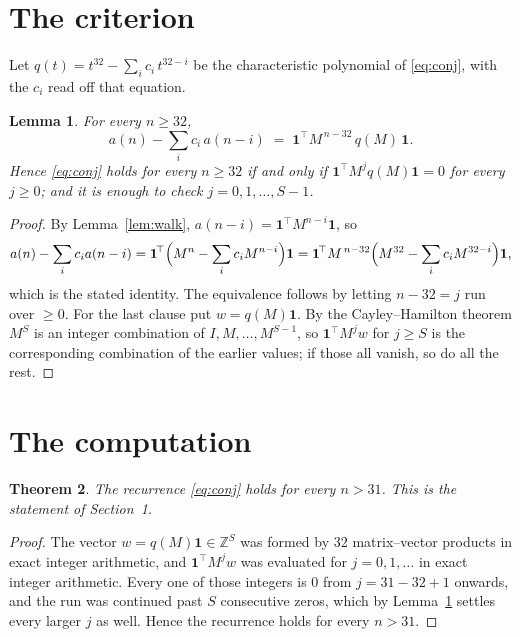 \documentclass[11pt,a4paper]{article}
\theoremstyle{plain}
\newtheorem{theorem}{Theorem}
\newtheorem{lemma}[theorem]{Lemma}
\theoremstyle{definition}
\begin{document}
\section{The criterion}

Let $q(t)=t^{32}-\sum_{i}c_i\,t^{32-i}$ be the characteristic polynomial of
\eqref{eq:conj}, with the $c_i$ read off that equation.

\begin{lemma}\label{lem:crit}
For every $n\ge32$,
\[
a(n)-\sum_i c_i\,a(n-i)\;=\;\mathbf{1}^{\!\top}M^{\,n-32}\,q(M)\,\mathbf{1} .
\]
Hence \eqref{eq:conj} holds for every $n\ge32$ if and only if
$\mathbf{1}^{\!\top}M^{j}q(M)\mathbf{1}=0$ for every $j\ge0$; and it is enough to
check $j=0,1,\dots,S-1$.
\end{lemma}

\begin{proof}
By Lemma~\ref{lem:walk}, $a(n-i)=\mathbf{1}^{\!\top}M^{n-i}\mathbf{1}$, so
\[
a(n)-\sum_i c_i a(n-i)
=\mathbf{1}^{\!\top}\Bigl(M^{n}-\sum_i c_i M^{n-i}\Bigr)\mathbf{1}
=\mathbf{1}^{\!\top}M^{\,n-32}\Bigl(M^{32}-\sum_i c_i M^{32-i}\Bigr)\mathbf{1},
\]
which is the stated identity. The equivalence follows by letting $n-32=j$ run over
$\ge0$. For the last clause put $w=q(M)\mathbf{1}$. By the Cayley--Hamilton theorem
$M^{S}$ is an integer combination of $I,M,\dots,M^{S-1}$, so
$\mathbf{1}^{\!\top}M^{j}w$ for $j\ge S$ is the corresponding combination of the
earlier values; if those all vanish, so do all the rest.
\end{proof}

\section{The computation}

\begin{theorem}
The recurrence \eqref{eq:conj} holds for every $n>31$. This is the statement of
Section~1.
\end{theorem}

\begin{proof}
The vector $w=q(M)\mathbf{1}\in\mathbb{Z}^{S}$ was formed by $32$ matrix--vector
products in exact integer arithmetic, and $\mathbf{1}^{\!\top}M^{j}w$ was evaluated for
$j=0,1,\dots$ in exact integer arithmetic. Every one of those integers is $0$ from
$j=31-32+1$ onwards, and the run was continued past $S$ consecutive zeros, which by
Lemma~\ref{lem:crit} settles every larger $j$ as well. Hence the recurrence holds for
every $n>31$.
\end{proof}
\end{document}
